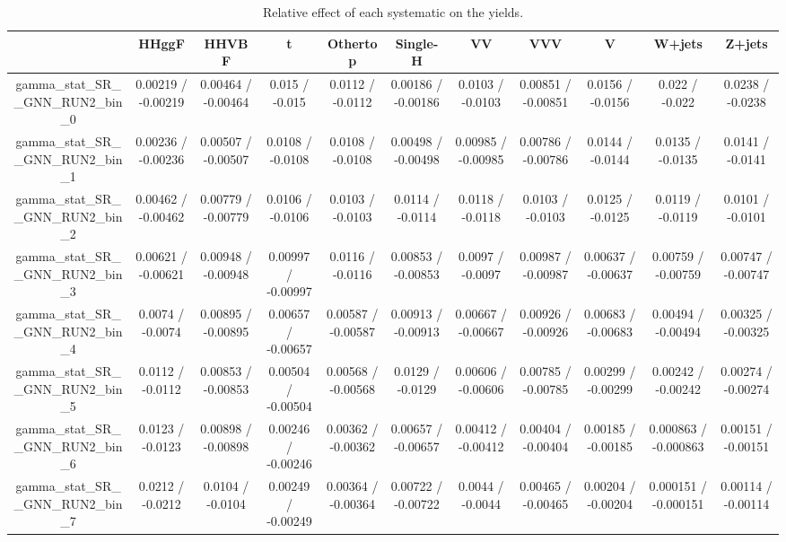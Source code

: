 \documentclass[10pt]{article}
\begin{document}
\begin{table}[htbp]
\begin{center}
\begin{tabular}{|c|c|c|c|c|c|c|c|c|c|c|}
\hline 
      & HHggF      & HHVBF      & t      & Othertop      & Single-H      & VV      & VVV      & V      & W+jets      & Z+jets \\ 
\hline 
  gamma_stat_SR__GNN_RUN2_bin_0 & 0.00219 / -0.00219 & 0.00464 / -0.00464 & 0.015 / -0.015 & 0.0112 / -0.0112 & 0.00186 / -0.00186 & 0.0103 / -0.0103 & 0.00851 / -0.00851 & 0.0156 / -0.0156 & 0.022 / -0.022 & 0.0238 / -0.0238 \\ 
  gamma_stat_SR__GNN_RUN2_bin_1 & 0.00236 / -0.00236 & 0.00507 / -0.00507 & 0.0108 / -0.0108 & 0.0108 / -0.0108 & 0.00498 / -0.00498 & 0.00985 / -0.00985 & 0.00786 / -0.00786 & 0.0144 / -0.0144 & 0.0135 / -0.0135 & 0.0141 / -0.0141 \\ 
  gamma_stat_SR__GNN_RUN2_bin_2 & 0.00462 / -0.00462 & 0.00779 / -0.00779 & 0.0106 / -0.0106 & 0.0103 / -0.0103 & 0.0114 / -0.0114 & 0.0118 / -0.0118 & 0.0103 / -0.0103 & 0.0125 / -0.0125 & 0.0119 / -0.0119 & 0.0101 / -0.0101 \\ 
  gamma_stat_SR__GNN_RUN2_bin_3 & 0.00621 / -0.00621 & 0.00948 / -0.00948 & 0.00997 / -0.00997 & 0.0116 / -0.0116 & 0.00853 / -0.00853 & 0.0097 / -0.0097 & 0.00987 / -0.00987 & 0.00637 / -0.00637 & 0.00759 / -0.00759 & 0.00747 / -0.00747 \\ 
  gamma_stat_SR__GNN_RUN2_bin_4 & 0.0074 / -0.0074 & 0.00895 / -0.00895 & 0.00657 / -0.00657 & 0.00587 / -0.00587 & 0.00913 / -0.00913 & 0.00667 / -0.00667 & 0.00926 / -0.00926 & 0.00683 / -0.00683 & 0.00494 / -0.00494 & 0.00325 / -0.00325 \\ 
  gamma_stat_SR__GNN_RUN2_bin_5 & 0.0112 / -0.0112 & 0.00853 / -0.00853 & 0.00504 / -0.00504 & 0.00568 / -0.00568 & 0.0129 / -0.0129 & 0.00606 / -0.00606 & 0.00785 / -0.00785 & 0.00299 / -0.00299 & 0.00242 / -0.00242 & 0.00274 / -0.00274 \\ 
  gamma_stat_SR__GNN_RUN2_bin_6 & 0.0123 / -0.0123 & 0.00898 / -0.00898 & 0.00246 / -0.00246 & 0.00362 / -0.00362 & 0.00657 / -0.00657 & 0.00412 / -0.00412 & 0.00404 / -0.00404 & 0.00185 / -0.00185 & 0.000863 / -0.000863 & 0.00151 / -0.00151 \\ 
  gamma_stat_SR__GNN_RUN2_bin_7 & 0.0212 / -0.0212 & 0.0104 / -0.0104 & 0.00249 / -0.00249 & 0.00364 / -0.00364 & 0.00722 / -0.00722 & 0.0044 / -0.0044 & 0.00465 / -0.00465 & 0.00204 / -0.00204 & 0.000151 / -0.000151 & 0.00114 / -0.00114 \\ 
\hline 
\end{tabular} 
\caption{Relative effect of each systematic on the yields.} 
\end{center} 
\end{table} 
\end{document}
